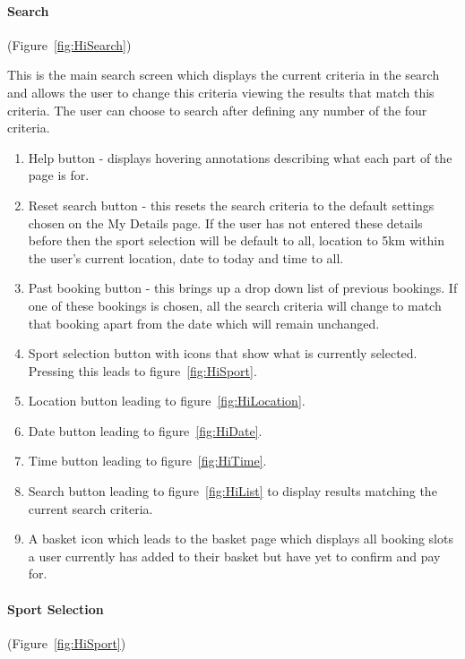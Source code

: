 \paragraph{Search} (Figure~\ref{fig:HiSearch})


This is the main search screen which displays the current criteria in the
search and allows the user to change this criteria viewing the results that
match this criteria. The user can choose to search after defining any number of
the four criteria.
\begin{enumerate}
	\item Help button - displays hovering annotations describing what each part
		  of the page is for.
	\item Reset search button - this resets the search criteria to the default
		  settings chosen on the My Details page. If the user has not entered
		  these details before then the sport selection will be default to all,
		  location to 5km within the user's current location, date to today
		  and time to all.
	\item Past booking button - this brings up a drop down list of previous
		  bookings. If one of these bookings is chosen, all the search criteria
		  will change to match that booking apart from the date which will remain
		  unchanged.
	\item Sport selection button with icons that show what is currently selected.
		  Pressing this leads to figure~\ref{fig:HiSport}.
	\item Location button leading to figure~\ref{fig:HiLocation}.
	\item Date button leading to figure~\ref{fig:HiDate}.
	\item Time button leading to figure~\ref{fig:HiTime}.
	\item Search button leading to figure~\ref{fig:HiList} to display results
		  matching the current search criteria.
	\item A basket icon which leads to the basket page which displays all booking
		  slots a user currently has added to their basket but have yet to confirm
		  and pay for.
\end{enumerate}

\paragraph{Sport Selection} (Figure~\ref{fig:HiSport})


